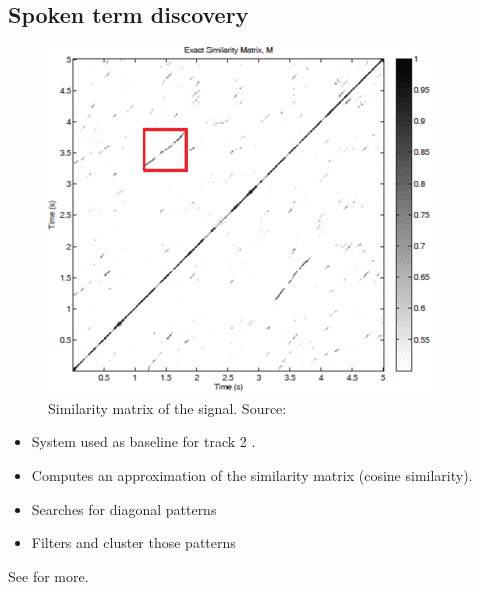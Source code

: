 \documentclass[final]{beamer}
\begin{document}
\begin{frame}[t]
\begin{multicols}{2}

\subsection{Spoken term discovery}

\begin{multicols}{2} %

\begin{figure}
  \begin{center}
    \includegraphics[width=0.6\columnwidth]{similarity_matrix}
  \end{center}
  \caption{\label{fig:system}Similarity matrix of the signal. Source: \cite{jansenvandurme2011}}
\end{figure}
\columnbreak

\begin{itemize}
\item System used as baseline for track 2 \cite{versteeghetal2015}.
\item Computes an approximation of the similarity matrix (cosine similarity).
\item Searches for diagonal patterns
\item Filters and cluster those patterns
\end{itemize}
See \cite{jansenvandurme2011} for more.

\end{multicols}



\end{multicols}
\end{frame}
\end{document}
